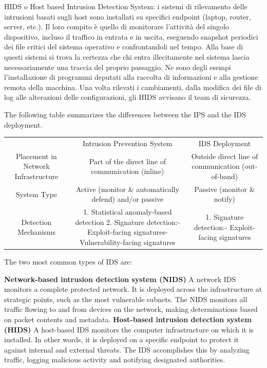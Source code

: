 HIDS o Host based Intrusion Detection System: i sistemi di rilevamento delle intrusioni basati sugli host sono installati su specifici endpoint (laptop, router, server, etc.). Il loro compito è quello di monitorare l’attività del singolo dispositivo, incluso il traffico in entrata e in uscita, eseguendo snapshot periodici dei file critici del sistema operativo e confrontandoli nel tempo. Alla base di questi sistemi si trova la certezza che chi entra illecitamente nel sistema lascia necessariamente una traccia del proprio passaggio. Ne sono degli esempi l’installazione di programmi deputati alla raccolta di informazioni e alla gestione remota della macchina. Una volta rilevati i cambiamenti, dalla modifica dei file di log alle alterazioni delle configurazioni, gli HIDS avvisano il team di sicurezza.


The following table summarizes the differences between the IPS and the IDS deployment.

\begin{table}
    \begin{tabular}{c|c|c}
   & Intrusion Prevention System &	IDS Deployment \\
   Placement in Network Infrastructure &		Part of the direct line of communication (inline) &		Outside direct line of communication (out-of-band) \\
System Type	 &	Active (monitor \& automatically defend) and/or passive	 &	Passive (monitor \& notify) \\
Detection Mechanisms	 &	1. Statistical anomaly-based detection 2. Signature detection:- Exploit-facing signatures- Vulnerability-facing signatures	 &	1. Signature detection:- Exploit-facing signatures \\
    \end{tabular}
\end{table}

The two most common types of IDS are:

\textbf{Network-based intrusion detection system (NIDS)}
A network IDS monitors a complete protected network. It is deployed across the infrastructure at strategic points, such as the most vulnerable subnets. The NIDS monitors all traffic flowing to and from devices on the network, making determinations based on packet contents and metadata.
\textbf{Host-based intrusion detection system (HIDS)}
A host-based IDS monitors the computer infrastructure on which it is installed. In other words, it is deployed on a specific endpoint to protect it against internal and external threats. The IDS accomplishes this by analyzing traffic, logging malicious activity and notifying designated authorities.


